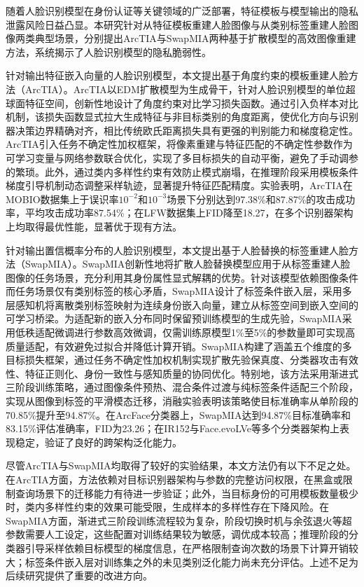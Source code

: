 \begin{conclusions}

随着人脸识别模型在身份认证等关键领域的广泛部署，特征模板与模型输出的隐私泄露风险日益凸显。本研究针对从特征模板重建人脸图像与从类别标签重建人脸图像两类典型场景，分别提出ArcTIA与SwapMIA两种基于扩散模型的高效图像重建方法，系统揭示了人脸识别模型的隐私脆弱性。

针对输出特征嵌入向量的人脸识别模型，本文提出基于角度约束的模板重建人脸方法（ArcTIA）。ArcTIA以EDM扩散模型为生成骨干，针对人脸识别模型的单位超球面特征空间，创新性地设计了角度约束对比学习损失函数。通过引入负样本对比机制，该损失函数显式拉大生成特征与非目标类别的角度距离，使优化方向与识别器决策边界精确对齐，相比传统欧氏距离损失具有更强的判别能力和梯度稳定性。ArcTIA引入任务不确定性加权框架，将像素重建与特征匹配的不确定性参数作为可学习变量与网络参数联合优化，实现了多目标损失的自动平衡，避免了手动调参的繁琐。此外，通过类内多样性约束有效防止模式崩塌，在推理阶段采用模板条件梯度引导机制动态调整采样轨迹，显著提升特征匹配精度。实验表明，ArcTIA在MOBIO数据集上于误识率$10^{-2}$和$10^{-3}$场景下分别达到97.38\%和87.87\%的攻击成功率，平均攻击成功率87.54\%；在LFW数据集上FID降至18.27，在多个识别器架构上均取得最优性能，显著优于现有方法。

针对输出置信概率分布的人脸识别模型，本文提出基于人脸替换的标签重建人脸方法（SwapMIA）。SwapMIA创新性地将扩散人脸替换模型应用于从标签重建人脸图像的任务场景，充分利用其身份属性显式解耦的优势。针对该模型依赖图像条件而任务场景仅有类别标签的核心矛盾，SwapMIA设计了标签条件嵌入层，采用多层感知机将离散类别标签映射为连续身份嵌入向量，建立从标签空间到嵌入空间的可学习桥梁。为适配新的嵌入分布同时保留预训练模型的生成先验，SwapMIA采用低秩适配微调进行参数高效微调，仅需训练原模型1\%至5\%的参数量即可实现高质量适配，有效避免过拟合并降低计算开销。SwapMIA构建了涵盖五个维度的多目标损失框架，通过任务不确定性加权机制实现扩散先验保真度、分类器攻击有效性、特征正则化、身份一致性与感知质量的协同优化。特别地，该方法采用渐进式三阶段训练策略，通过图像条件预热、混合条件过渡与纯标签条件适配三个阶段，实现从图像到标签的平滑模态迁移，消融实验表明该策略使目标准确率从单阶段的70.85\%提升至94.87\%。在ArcFace分类器上，SwapMIA达到94.87\%目标准确率和83.15\%评估准确率，FID为23.26；在IR152与Face.evoLVe等多个分类器架构上表现稳定，验证了良好的跨架构泛化能力。

尽管ArcTIA与SwapMIA均取得了较好的实验结果，本文方法仍有以下不足之处。在ArcTIA方面，方法依赖对目标识别器架构与参数的完整访问权限，在黑盒或限制查询场景下的迁移能力有待进一步验证；此外，当目标身份的可用模板数量极少时，类内多样性约束的效果可能受限，生成样本的多样性存在下降风险。在SwapMIA方面，渐进式三阶段训练流程较为复杂，阶段切换时机与余弦退火等超参数需要人工设定，这些配置对训练结果较为敏感，调优成本较高；推理阶段的分类器引导采样依赖目标模型的梯度信息，在严格限制查询次数的场景下计算开销较大；标签条件嵌入层对训练集之外的未见类别泛化能力尚未充分评估。上述不足为后续研究提供了重要的改进方向。


\end{conclusions}
